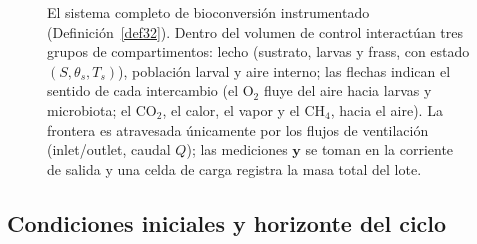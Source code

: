 \begin{figure}[htbp]
\caption{El sistema completo de bioconversi\'on instrumentado (Definici\'on~\ref{def32}). Dentro del volumen de control interact\'uan tres grupos de compartimentos: lecho (sustrato, larvas y frass, con estado $(S, \theta_s, T_s)$), poblaci\'on larval y aire interno; las flechas indican el sentido de cada intercambio (el O$_2$ fluye del aire hacia larvas y microbiota; el CO$_2$, el calor, el vapor y el CH$_4$, hacia el aire). La frontera es atravesada \'unicamente por los flujos de ventilaci\'on (inlet/outlet, caudal $Q$); las mediciones $\mathbf{y}$ se toman en la corriente de salida y una celda de carga registra la masa total del lote.}
\label{fig:sistema-completo}
\end{figure}

\subsection{Condiciones iniciales y horizonte del ciclo}

